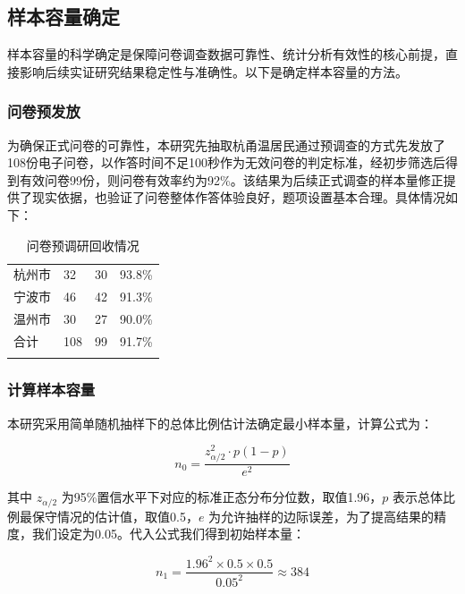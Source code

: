 \subsection{样本容量确定}

样本容量的科学确定是保障问卷调查数据可靠性、统计分析有效性的核心前提，直接影响后续实证研究结果稳定性与准确性。以下是确定样本容量的方法。

\subsubsection{问卷预发放}

为确保正式问卷的可靠性，本研究先抽取杭甬温居民通过预调查的方式先发放了108份电子问卷，以作答时间不足100秒作为无效问卷的判定标准，经初步筛选后得到有效问卷99份，则问卷有效率约为92\%。该结果为后续正式调查的样本量修正提供了现实依据，也验证了问卷整体作答体验良好，题项设置基本合理。具体情况如下：

\begin{table}[H]
\centering
\caption{问卷预调研回收情况}
\label{tab:presurvey}
\begin{tabular}{M{3.5cm}M{3.5cm}M{3.5cm}M{3.5cm}}
\bluetoprule
{}
 &  &  &  \\
\hline
杭州市 & 32 & 30 & 93.8\% \\
宁波市 & 46 & 42 & 91.3\% \\
温州市 & 30 & 27 & 90.0\% \\
合计 & 108 & 99 & 91.7\% \\
\bluebottomrule
\end{tabular}
\end{table}

\subsubsection{计算样本容量}

本研究采用简单随机抽样下的总体比例估计法确定最小样本量，计算公式为：

\begin{equation}
n_0=\frac{z_{\alpha/2}^{2}\cdot p(1-p)}{e^{2}}
\end{equation}

其中 $z_{\alpha/2}$ 为95\%置信水平下对应的标准正态分布分位数，取值1.96，$p$ 表示总体比例最保守情况的估计值，取值0.5，$e$ 为允许抽样的边际误差，为了提高结果的精度，我们设定为0.05。代入公式我们得到初始样本量：

\begin{equation}
n_1=\frac{1.96^{2}\times0.5\times0.5}{0.05^{2}}\approx384
\end{equation}

